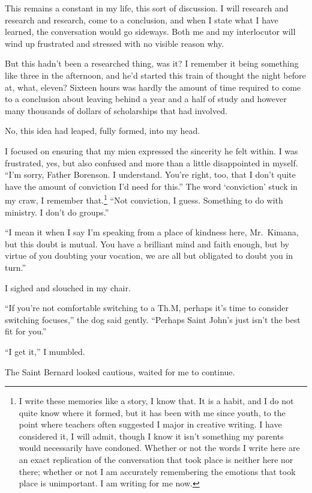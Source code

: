 This remains a constant in my life, this sort of discussion. I will research and research and research, come to a conclusion, and when I state what I have learned, the conversation would go sideways. Both me and my interlocutor will wind up frustrated and stressed with no visible reason why.

But this hadn't been a researched thing, was it? I remember it being something like three in the afternoon, and he'd started this train of thought the night before at, what, eleven? Sixteen hours was hardly the amount of time required to come to a conclusion about leaving behind a year and a half of study and however many thousands of dollars of scholarships that had involved.

No, this idea had leaped, fully formed, into my head.

I focused on ensuring that my mien expressed the sincerity he felt within. I was frustrated, yes, but also confused and more than a little disappointed in myself. ``I'm sorry, Father Borenson. I understand. You're right, too, that I don't quite have the amount of conviction I'd need for this.'' The word `conviction' stuck in my craw, I remember that.\footnote{I write these memories like a story, I know that. It is a habit, and I do not quite know where it formed, but it has been with me since youth, to the point where teachers often suggested I major in creative writing. I have considered it, I will admit, though I know it isn't something my parents would necessarily have condoned. Whether or not the words I write here are an exact replication of the conversation that took place is neither here nor there; whether or not I am accurately remembering the emotions that took place is unimportant. I am writing for me now.} ``Not conviction, I guess. Something to do with ministry. I don't do groups.''

``I mean it when I say I'm speaking from a place of kindness here, Mr.~Kimana, but this doubt is mutual. You have a brilliant mind and faith enough, but by virtue of you doubting your vocation, we are all but obligated to doubt you in turn.''

I sighed and slouched in my chair.

``If you're not comfortable switching to a Th.M, perhaps it's time to consider switching focuses,'' the dog said gently. ``Perhaps Saint John's just isn't the best fit for you.''

``I get it,'' I mumbled.

The Saint Bernard looked cautious, waited for me to continue.

